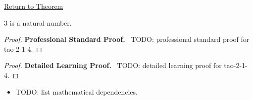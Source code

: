 \newpage
{}
\label{prf:tao-2-1-4}

\begin{remark*}[Return]
\hyperref[prop:tao-2-1-4]{Return to Theorem}
\end{remark*}

\begin{theorem*}
$3$ is a natural number.
\end{theorem*}

\begin{proof}
\textbf{Professional Standard Proof.}~
TODO: professional standard proof for tao-2-1-4.
\end{proof}

\begin{proof}
\textbf{Detailed Learning Proof.}~
TODO: detailed learning proof for tao-2-1-4.
\end{proof}

\begin{remark*}
\end{remark*}

\begin{dependencies}
\begin{itemize}
  \item TODO: list mathematical dependencies.
\end{itemize}
\end{dependencies}

\clearpage
